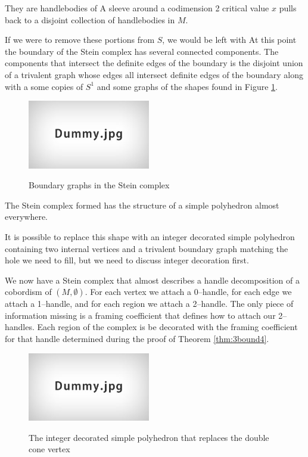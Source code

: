 	
	They are handlebodies of 
	A sleeve around a codimension 2 critical value $x$ pulls back to a disjoint collection of handlebodies in $M$.
	
	If we were to remove these portions from $S$, we would be left with 
	At this point the boundary of the Stein complex has several connected components.
	The components that intersect the definite edges of the boundary 
	is the disjoint union of a trivalent graph whose edges all intersect definite edges of the boundary along with a some copies of $S^1$ and some graphs of the shapes found in Figure \ref{fig:holegraphs}.


	
	\begin{figure}
		\centering
		\captionsetup{justification=centering}
		\caption{Boundary graphs in the Stein complex}
		\includegraphics[height=3cm]{figures/dummy.jpg}
		\label{fig:holegraphs}
	\end{figure}

The Stein complex formed has the structure of a simple polyhedron almost everywhere.


It is possible to replace this shape with an integer decorated simple polyhedron containing two internal vertices and a trivalent boundary graph matching the hole we need to fill, but we need to discuss integer decoration first.

We now have a Stein complex that almost describes a handle decomposition of a cobordism of $(M,\emptyset)$.
For each vertex we attach a 0--handle, for each edge we attach a 1--handle, and for each region we attach a 2--handle.
The only piece of information missing is a framing coefficient that defines how to attach our 2--handles.
Each region of the complex is be decorated with the framing coefficient for that handle determined during the proof of Theorem \ref{thm:3bound4}.

\begin{figure}
	\centering
	\captionsetup{justification=centering}
	\caption{The integer decorated simple polyhedron that replaces the double cone vertex}
	\includegraphics[height=3cm]{figures/dummy.jpg}
	\label{fig:simplepoly}
\end{figure}

